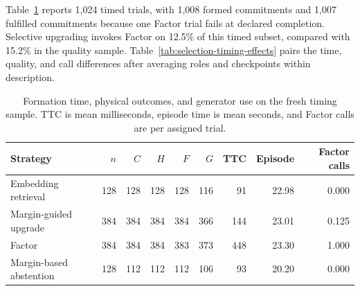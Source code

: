 \documentclass[sigconf,nonacm,balance=false]{aamas}
\newcommand{\tabstyle}{\small\setlength{\tabcolsep}{3pt}\renewcommand{\arraystretch}{1.10}}
\begin{document}
Table~\ref{tab:selection-timing-full} reports 1,024 timed trials, with 1,008 formed commitments and 1,007 fulfilled commitments because one Factor trial fails at declared completion. Selective upgrading invokes Factor on 12.5\% of this timed subset, compared with 15.2\% in the quality sample. Table~\ref{tab:selection-timing-effects} pairs the time, quality, and call differences after averaging roles and checkpoints within description.
\begin{table}[!htbp]
\centering\tabstyle
\caption{Formation time, physical outcomes, and generator use on the fresh timing sample. TTC is mean milliseconds, episode time is mean seconds, and Factor calls are per assigned trial.}
\label{tab:selection-timing-full}
\begin{tabular}{@{}lrrrrrrrr@{}}
\toprule
\textbf{Strategy} & $n$ & $C$ & $H$ & $F$ & $G$ & \textbf{TTC} & \textbf{Episode} & \textbf{Factor calls}\\
\midrule
Embedding retrieval & 128 & 128 & 128 & 128 & 116 & 91 & 22.98 & 0.000\\
Margin-guided upgrade & 384 & 384 & 384 & 384 & 366 & 144 & 23.01 & 0.125\\
Factor & 384 & 384 & 384 & 383 & 373 & 448 & 23.30 & 1.000\\
Margin-based abstention & 128 & 112 & 112 & 112 & 106 & 93 & 20.20 & 0.000\\
\bottomrule
\end{tabular}
\end{table}
\end{document}
